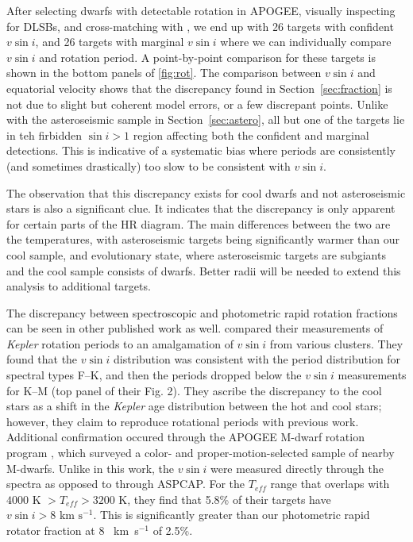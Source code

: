 \documentclass[manuscript]{aastex6}
\newcommand{\vsini}{\ensuremath{v \sin i}}
\newcommand{\Kepler}{\mbox{\textit{Kepler}}}
\newcommand{\Teff}{\ensuremath{T_{eff}}}
\newcommand{\kms}{\textrm{~km~s}\ensuremath{^{-1}}}
\begin{document}
After selecting dwarfs with detectable rotation in APOGEE,
visually inspecting for DLSBs, and cross-matching with \citet{McQuillan14}, we 
end up with 26 targets with confident \vsini{}, and 26 targets with marginal
\vsini{} where we can individually compare \vsini{} and rotation period. A 
point-by-point
comparison for these targets is shown in the bottom panels of
\cref{fig:rot}. The comparison between \vsini{} and equatorial velocity shows
that the discrepancy found in Section~\ref{sec:fraction} is not due to slight
but coherent model errors, or a few discrepant points. Unlike with the
asteroseismic sample in Section~\ref{sec:astero}, all but one of the targets
lie in teh firbidden \(\sin i > 1\) region affecting both the confident and
marginal detections. This is indicative of a systematic
bias where periods are consistently (and sometimes drastically) too slow to be
consistent with \vsini{}.

The observation that this discrepancy exists for cool dwarfs and not
asteroseismic stars is also a significant clue. It indicates that the
discrepancy is only apparent for certain parts of the HR diagram. The main
differences between the two are the temperatures, with asteroseismic targets
being significantly warmer than our cool sample, and evolutionary state, where
asteroseismic targets are subgiants and the cool sample consists of dwarfs.
Better radii will be needed to extend this analysis to additional targets.

The discrepancy between spectroscopic and 
photometric rapid rotation fractions can be seen in other published work as well. 
\citet{Nielsen13} compared their measurements of \Kepler{} rotation periods to
an amalgamation of \vsini{} from various clusters. They found that the
\vsini{} distribution was consistent with the period distribution for spectral
types F--K, and then the periods dropped below the \vsini{} measurements for
K--M (top panel of their Fig. 2). They ascribe the discrepancy to the cool
stars as a shift in the \Kepler{} age distribution between the hot and cool
stars; however, they claim to reproduce rotational periods with previous work. 
Additional confirmation occured through the APOGEE M-dwarf rotation
program \citep{Gilhool18}, which surveyed a color- and proper-motion-selected 
sample of nearby M-dwarfs. Unlike in this work, the \vsini{} were measured 
directly through the spectra as opposed to through ASPCAP\@. For the \Teff{} range that
overlaps with \citet{McQuillan14} \(4000 \textrm{ K } > \Teff > 3200\) K, they 
find that 5.8\% of their targets have \(\vsini > 8 \kms\). This is 
significantly greater than our photometric rapid rotator fraction at 8 \kms{} 
of 2.5\%. 
\end{document}

